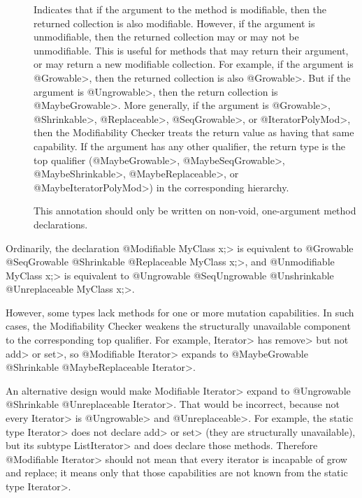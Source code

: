 \begin{description}

\item[]
Indicates that if the argument to the method is modifiable, then the returned collection is
also modifiable. However, if the argument is unmodifiable, then the returned collection may or may
not be unmodifiable. This is useful for methods that may return their argument, or may return a
new modifiable collection.
For example, if the argument is \<@Growable>, then the returned collection is also
\<@Growable>. But if the argument is \<@Ungrowable>, then the return collection is \<@MaybeGrowable>.
More generally, if the argument is \<@Growable>, \<@Shrinkable>,
\<@Replaceable>, \<@SeqGrowable>, or \<@IteratorPolyMod>, then the Modifiability Checker
treats the return value as having that same capability. If the argument has
any other qualifier, the return type is the top qualifier (\<@MaybeGrowable>,
\<@MaybeSeqGrowable>, \<@MaybeShrinkable>, \<@MaybeReplaceable>, or \<@MaybeIteratorPolyMod>) in
the corresponding hierarchy.

This annotation should only be written on non-void, one-argument method declarations.

\end{description}


Ordinarily, the declaration
\<@Modifiable MyClass x;> is equivalent to
\<@Growable @SeqGrowable @Shrinkable @Replaceable MyClass x;>,
and
\<@Unmodifiable MyClass x;> is equivalent to
\<@Ungrowable @SeqUngrowable @Unshrinkable @Unreplaceable MyClass x;>.

However, some types lack methods for one or more mutation
capabilities.  In such cases, the Modifiability Checker weakens the
structurally unavailable component to the corresponding top qualifier.
For example, \<Iterator> has
\<remove> but not \<add> or \<set>, so \<@Modifiable Iterator> expands to
\<@MaybeGrowable @Shrinkable @MaybeReplaceable Iterator>.



An alternative design would make \<Modifiable Iterator> expand to
\<@Ungrowable @Shrinkable @Unreplaceable Iterator>.
That would be incorrect, because not every \<Iterator> is \<@Ungrowable> and \<@Unreplaceable>.
For example, the static type \<Iterator> does not declare \<add> or \<set>
(they are structurally unavailable), but its subtype
\<ListIterator> and does declare those methods.
Therefore \<@Modifiable Iterator> should not mean that every
iterator is incapable of grow and replace; it means only that those capabilities
are not known from the static type \<Iterator>.

